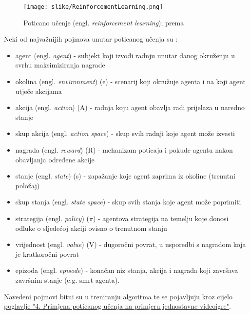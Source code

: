 \documentclass[]{foi} %
\begin{document}
\begin{figure}[H]
    \centering
    \texttt{[image: slike/ReinforcementLearning.png]}
    \caption{Poticano učenje (engl. \textit{reinforcement learning}); prema \cite{MLGrafovi}}
\end{figure}

Neki od najvažnijih pojmova unutar poticanog učenja su \cite{RLkarakt} \cite[str. 15, 18, 73]{AIandGames}:
\begin{itemize}
    \item agent (engl. \textit{agent}) - subjekt koji izvodi radnju unutar danog okruženju u svrhu maksimiziranja nagrade
    \item okolina (engl. \textit{environment}) (e) - scenarij koji okružuje agenta i na koji agent utječe akcijama
    \item akcija (engl. \textit{action}) (A) - radnja koju agent obavlja radi prijelaza u naredno stanje
    \item skup akcija (engl. \textit{action space}) - skup svih radnji koje agent može izvesti
    \item nagrada (engl. \textit{reward}) (R) - mehanizam poticaja i pokude agentu nakon obavljanja određene akcije
    \item stanje (engl. \textit{state}) (s) - zapažanje koje agent zaprima iz okoline (trenutni položaj)
    \item skup stanja (engl. \textit{state space}) - skup svih stanja koje agent može poprimiti
    \item strategija (engl. \textit{policy}) ($\pi$) - agentova strategija na temelju koje donosi odluke o sljedećoj akciji ovisno o trenutnom stanju
    \item vrijednost (engl. \textit{value}) (V) - dugoročni povrat, u usporedbi s nagradom koja je kratkoročni povrat
    \item epizoda (engl. \textit{episode}) - konačan niz stanja, akcija i nagrada koji završava završnim stanje (e.g. smrt agenta).
\end{itemize}

Navedeni pojmovi bitni su u treniranju algoritma te se pojavljuju kroz cijelo \hyperref[cha: primjena]{poglavlje "4. Primjena poticanog učenja na primjeru jednostavne videoigre"}. 
\end{document}
